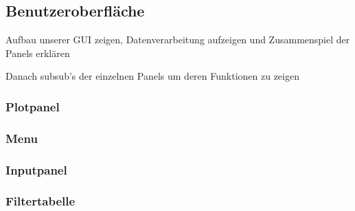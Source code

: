 \subsection{Benutzeroberfläche} \label{subsec:benutzeroberflaeche}
Aufbau unserer GUI zeigen, Datenverarbeitung aufzeigen und Zusammenspiel der Panels erklären

Danach subsub's der einzelnen Panels um deren Funktionen zu zeigen


\subsubsection{Plotpanel} \label{subsubsec:plotpanel}



\subsubsection{Menu}\label{subsubsec:menu}


\subsubsection{Inputpanel} \label{subsubsec:inputpanel}


\subsubsection{Filtertabelle} \label{subsubsec:filtertabelle}





